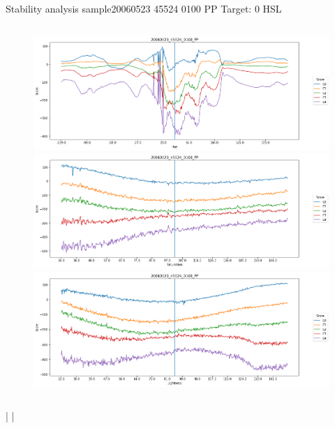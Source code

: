 \documentclass{beamer}
\begin{document}
\begin{frame}{Stability analysis sample}{20060523 45524 0100 PP Target: 0 HSL}
\begin{columns}
\begin{column}{0.45\textwidth}
\begin{figure}[p]
			\includegraphics[width=\textwidth]{chapter_stability/20060523_45524_0100_PP/h/scores.png}			\includegraphics[width=\textwidth]{chapter_stability/20060523_45524_0100_PP/s/scores.png}			\includegraphics[width=\textwidth]{chapter_stability/20060523_45524_0100_PP/l/scores.png}
		\end{figure}
	\end{column}
\end{columns}
\href{run:videos_stability/Messidor_20060523_45524_0100_PP_Target_0_Checking_Hue_Sensitivity.mp4}{\color{blue}{Hue}} | \href{run:videos_stability/Messidor_20060523_45524_0100_PP_Target_0_Checking_Saturation_Sensitivity.mp4}{\color{blue}{Saturation}} | \href{run:videos_stability/Messidor_20060523_45524_0100_PP_Target_0_Checking_Luminance_Sensitivity.mp4}{\color{blue}{Lightness}}
\end{frame}
\end{document}
